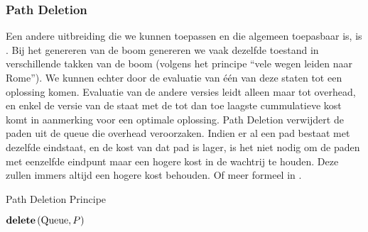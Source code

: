 \subsubsection{Path Deletion}
Een andere uitbreiding die we kunnen toepassen en die algemeen toepasbaar is, is . Bij het genereren van de boom genereren we vaak dezelfde toestand in verschillende takken van de boom (volgens het principe ``vele wegen leiden naar Rome''). We kunnen echter door de evaluatie van één van deze staten tot een oplossing komen. Evaluatie van de andere versies leidt alleen maar tot overhead, en enkel de versie van de staat met de tot dan toe laagste cummulatieve kost komt in aanmerking voor een optimale oplossing. Path Deletion verwijdert de paden uit de queue die overhead veroorzaken. Indien er al een pad bestaat met dezelfde eindstaat, en de kost van dat pad is lager, is het niet nodig om de paden met eenzelfde eindpunt maar een hogere kost in de wachtrij te houden. Deze zullen immers altijd een hogere kost behouden. Of meer formeel in .
\begin{algorithm}[htb]
\caption{Path Deletion Principe}
\label{alg:pathDeletion}
\begin{algorithmic}[1]
\STATE $\mbox{\bf delete}\left( \mbox{Queue},P \right)$
\ENDIF
\end{algorithmic}
\end{algorithm}
